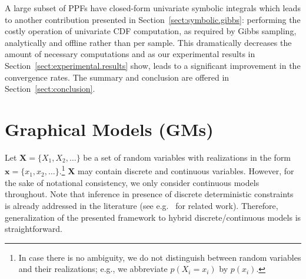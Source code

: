 \documentclass[]{article}
\renewcommand{\vec}[1]{\mathbf{#1}}
\newcommand{\pr}{p}
\begin{document}
A large subset of PPFs have closed-form univariate symbolic integrals which leads to another contribution
presented in Section~\ref{sect:symbolic.gibbs}: %
performing 
the costly operation of univariate CDF computation, as required by Gibbs sampling, analytically and offline rather than per sample.     
This dramatically decreases the amount of necessary computations and as our experimental results in Section~\ref{sect:experimental.results} show, 
leads to a significant improvement in the convergence rates. 
The summary and conclusion are offered in Section~\ref{sect:conclusion}. 



\section{Graphical Models (GMs)}
\label{sect:background}
Let $\vec{X} = \{X_1, X_2, \ldots\}$ be a set of random variables with realizations in the form 
$\vec{x} = \{x_1, x_2, \ldots\}$.\footnote{
In case there is no ambiguity, we do not distinguish between random variables and their realizations; e.g., we abbreviate $\pr(X_i = x_i)$ by $\pr(x_i)$.}
$\vec{X}$ may contain discrete and continuous variables. 
However, for the sake of notational consistency, %
we only consider continuous models throughout. 
Note that inference in presence of discrete deterministic constraints is already addressed in the literature 
(see e.g.\ \citep{li2013dynamic} for related work).
Therefore, generalization of the presented framework to hybrid discrete/continuous models is straightforward.   
\end{document}
